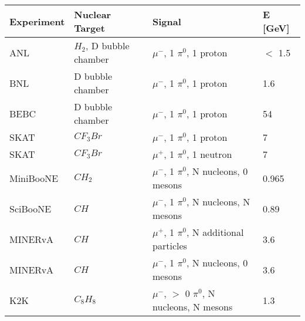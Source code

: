 \begin{table*} 
 \centering
 \begin{tabular}{| l | l | l | l |}
  \hline
   Experiment & Nuclear Target & Signal & E [GeV]\\ [0.1ex] \hline
 ANL \cite{bib:ANL1} & $H_2$, D bubble chamber & $\mu^-$, 1 $\pi^0$, 1 proton & $<$ 1.5 \\ 
 BNL \cite{bib:ANL2} & D bubble chamber & $\mu^-$, 1 $\pi^0$, 1 proton & 1.6 \\ 
 BEBC \cite{bib:HE_unknown1} & D bubble chamber & $\mu^-$, 1 $\pi^0$, 1 proton & 54 \\ 
 SKAT \cite{bib:HE_unknown2} & $CF_{3}Br$ & $\mu^-$, 1 $\pi^0$, 1 proton & 7 \\ 
 SKAT \cite{bib:HE_unknown2} & $CF_{3}Br$ & $\mu^+$, 1 $\pi^0$, 1 neutron & 7 \\ 
 MiniBooNE \cite{bib:miniboone_thesis} & $CH_2$ & $\mu^-$, 1 $\pi^0$, N nucleons, 0 mesons& 0.965 \\ 
 SciBooNE \cite{bib:sciboone_thesis} & $CH$ & $\mu^-$, 1 $\pi^0$, N nucleons, N mesons  & 0.89 \\
  MINERvA \cite{bib:minerva_thesis} & $CH$ & $\mu^+$, 1 $\pi^0$, N additional particles & 3.6 \\ 
  MINERvA \cite{bib:minerva_paper_2017} & $CH$ & $\mu^-$, 1 $\pi^0$, N nucleons, 0 mesons & 3.6 \\ 
 K2K \cite{bib:k2k_paper} & $C_{8}H_{8}$ & $\mu^-$, $>$ 0 $\pi^0$, N nucleons, N mesons& 1.3 \\ 
\hline

\end{tabular}
\end{table*}


